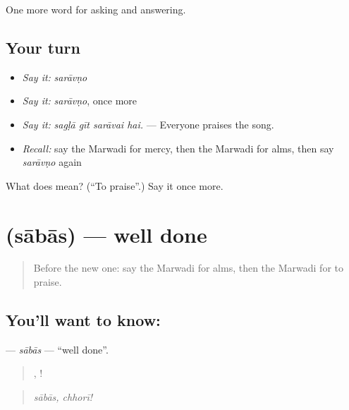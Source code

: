 \begin{grammarlens}[title={What you've built}]
One more word for asking and answering.
\end{grammarlens}

\subsection*{Your turn}
\begin{itemize}
\raggedright
  \item \emph{Say it:} \emph{sarāvṇo}
  \item \emph{Say it:} \emph{sarāvṇo}, once more
  \item \emph{Say it:} \emph{sagḷā gīt sarāvai hai.} — Everyone praises the song.
  \item \emph{Recall:} say the Marwadi for mercy, then the Marwadi for alms, then say \emph{sarāvṇo} again
\end{itemize}

\begin{tcolorbox}[breakable,colback=teal!4,colframe=teal!35!black,title={Before you move on}]
What does  mean? (\textquotedblleft{}To praise\textquotedblright{}.) Say it once more.
\end{tcolorbox}
\section[\texorpdfstring{\mw{साबास} (sābās)}{साबास (sābās)}]{ (sābās) — well done}

\label{lesson:MW-C275-sabas}



\begin{quote}
Before the new one: say the Marwadi for alms, then the Marwadi for to praise.
\end{quote}

\subsection*{You'll want to know: }
\textbf{} — \emph{sābās} — \textquotedblleft{}well done\textquotedblright{}.

\begin{quote}
, !
\end{quote}

\begin{quote}
\emph{sābās, chhorī!}
\end{quote}


